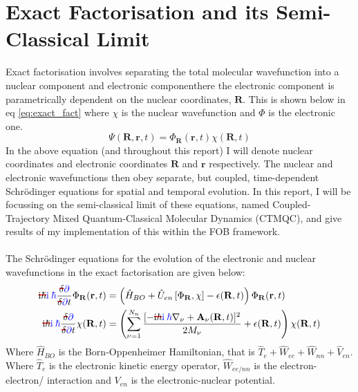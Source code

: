\section{Exact Factorisation and its Semi-Classical Limit}
Exact factorisation \cite{abedi_exact_2010} involves separating the total molecular wavefunction into a nuclear component and electronic componenthere the electronic component is parametrically dependent on the nuclear coordinates, $\mathbf{R}$. This is shown below in eq \eqref{eq:exact_fact} where $\chi$ is the nuclear wavefunction and $\Phi$ is the electronic one.
\begin{equation}
 \Psi(\mathbf{R}, \mathbf{r}, t) = \Phi_{\mathbf{R}}(\mathbf{r}, t) \chi(\mathbf{R}, t)
 \label{eq:exact_fact}
 \end{equation}
 In the above equation (and throughout this report) I will denote nuclear coordinates and electronic coordinates $\mathbf{R}$ and $\mathbf{r}$ respectively. The nuclear and electronic wavefunctions then obey separate, but coupled, time-dependent Schr\"odinger equations for spatial and temporal evolution. In this report, I will be focussing on the semi-classical limit of these equations, named Coupled-Trajectory Mixed Quantum-Classical Molecular Dynamics (CTMQC), and give results of my implementation of this within the FOB framework.
\\\\
The \remove{(} Schr\"odinger\remove{)} equations for the evolution of the electronic and nuclear wavefunctions in the exact factorisation \cite{abedi_exact_2010} are given below:
\begin{align}
	\mremove{\im\hbar}\madd{\im \: \hbar} \frac{\mremove{\delta}\madd{\partial}}{\mremove{\delta}\madd{\partial} t} \Phi_{\mathbf{R}}(\mathbf{r}, t) &= \left( \hat{H}_{BO} + \hat{U}_{en}\left[ \Phi_{\mathbf{R}}, \chi\right] - \epsilon(\mathbf{R}, t) \right) \Phi_{\mathbf{R}} (\mathbf{r}, t)
  \label{eq:electronic_exact}
\\
	\mremove{\im\hbar}\madd{\im \: \hbar} \frac{\mremove{\delta}\madd{\partial}}{\mremove{\delta}\madd{\partial} t} \chi (\mathbf{R}, t) &= \left( \sum_{\nu = 1}^{N_{n}} \frac{[-\mremove{\im\hbar}\madd{\im \: \hbar}\nabla_{\nu} + \mathbf{A}_{\nu}(\mathbf{R}, t)]^2}{2 M_{\nu}} + \epsilon(\mathbf{R}, t)\right) \chi (\mathbf{R}, t)
  \label{eq:nuclear_exact}
\end{align}
Where $\hat{H}_{BO}$ is the Born-Oppenheimer Hamiltonian, that is $\hat{T}_{e} + \hat{W}_{ee} + \hat{W}_{nn} + \hat{V}_{en}$. Where $\hat{T}_{e}$ is the electronic kinetic energy operator, $\hat{W}_{ee/nn}$ is the electron-electron/ interaction and $V_{en}$ is the electronic-nuclear potential.
